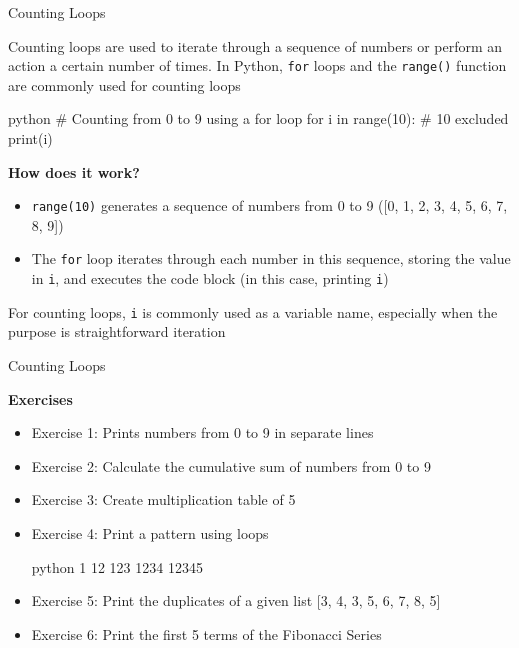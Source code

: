 \documentclass[
	11pt, 
]{beamer}
\begin{document}

\begin{frame}[fragile]{Counting Loops}

Counting loops are used to iterate through a sequence of numbers or perform an action a certain number of times. In Python, \texttt{for} loops and the \texttt{range()} function are commonly used for counting loops

\begin{mintedbox}{python}
# Counting from 0 to 9 using a for loop
for i in range(10): # 10 excluded
    print(i)
\end{mintedbox}

\begin{exampleblock}{\textbf{How does it work?}}
\begin{itemize}
    \item \texttt{range(10)} generates a sequence of numbers from 0 to 9 ([0, 1, 2, 3, 4, 5, 6, 7, 8, 9])
    \item The \texttt{for} loop iterates through each number in this sequence, storing the value in \texttt{i}, and executes the code block (in this case, printing \texttt{i})
\end{itemize}
\end{exampleblock}

\vspace{.1cm}
For counting loops, \texttt{i} is commonly used as a variable name, especially when the purpose is straightforward iteration

\end{frame}


\begin{frame}[fragile]{Counting Loops}

\begin{alertblock}{\textbf{Exercises}}
\begin{itemize}
    \item Exercise 1: Prints numbers from 0 to 9 in separate lines
    \item Exercise 2: Calculate the cumulative sum of numbers from 0 to 9
    \item Exercise 3: Create multiplication table of 5
    \item Exercise 4: Print a pattern using loops
\begin{mintedbox}{python}
1
12
123
1234
12345
\end{mintedbox}
    \item Exercise 5: Print the duplicates of a given list [3, 4, 3, 5, 6, 7, 8, 5]
    \item Exercise 6: Print the first 5 terms of the Fibonacci Series
\end{itemize}    
\end{alertblock}
\end{frame}
\end{document}
